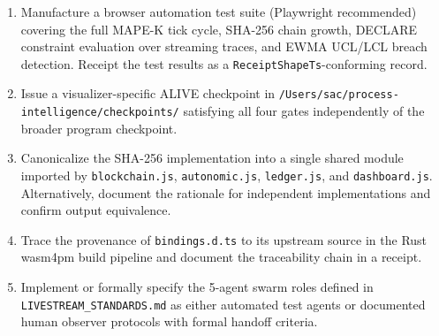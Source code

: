 \begin{enumerate}
  \item Manufacture a browser automation test suite (Playwright recommended) covering the
        full MAPE-K tick cycle, SHA-256 chain growth, DECLARE constraint evaluation over
        streaming traces, and EWMA UCL/LCL breach detection. Receipt the test results as
        a \texttt{ReceiptShapeTs}-conforming record.

  \item Issue a visualizer-specific ALIVE checkpoint in
        \texttt{/Users/sac/process-intelligence/checkpoints/} satisfying all four gates
        independently of the broader program checkpoint.

  \item Canonicalize the SHA-256 implementation into a single shared module imported by
        \texttt{blockchain.js}, \texttt{autonomic.js}, \texttt{ledger.js}, and
        \texttt{dashboard.js}. Alternatively, document the rationale for independent
        implementations and confirm output equivalence.

  \item Trace the provenance of \texttt{bindings.d.ts} to its upstream source in the Rust
        wasm4pm build pipeline and document the traceability chain in a receipt.

  \item Implement or formally specify the 5-agent swarm roles defined in
        \texttt{LIVESTREAM\_STANDARDS.md} as either automated test agents or documented
        human observer protocols with formal handoff criteria.
\end{enumerate}
